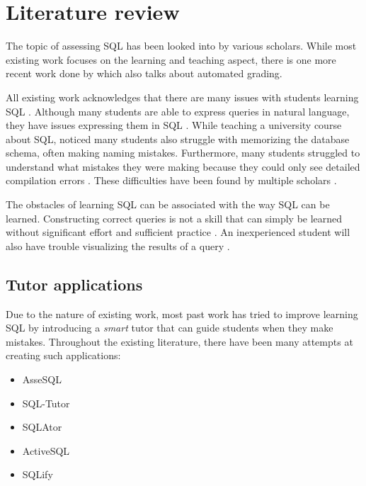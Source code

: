 \section{Literature review}

The topic of assessing SQL has been looked into by various scholars. While most existing work focuses on the learning and teaching aspect, there is one more recent work done by \cite{literature:xdata} which also talks about automated grading.

All existing work acknowledges that there are many issues with students learning SQL \citep{literature:assesql, literature:sqlify}. Although many students are able to express queries in natural language, they have issues expressing them in SQL \citep{literature:mitrovic}. While teaching a university course about SQL, \cite{literature:mitrovic} noticed many students also struggle with memorizing the database schema, often making naming mistakes. Furthermore, many students struggled to understand what mistakes they were making because they could only see detailed compilation errors \citep{literature:mitrovic}. These difficulties have been found by multiple scholars \citep{literature:assesql, literature:sqlify, literature:kearns, literature:mitrovic}.

The obstacles of learning SQL can be associated with the way SQL can be learned. Constructing correct queries is not a skill that can simply be learned without significant effort and sufficient practice \citep{literature:assesql}. An inexperienced student will also have trouble visualizing the results of a query \citep{literature:assesql}.

\subsection{Tutor applications} \label{ch:lit:sec:tutor}

Due to the nature of existing work, most past work has tried to improve learning SQL by introducing a \textit{smart} tutor that can guide students when they make mistakes. Throughout the existing literature, there have been many attempts at creating such applications:

\begin{itemize}
    \item AsseSQL \citep{literature:assesql}
    \item SQL-Tutor \citep{literature:kearns}
    \item SQLAtor \citep{literature:sqlator}
    \item ActiveSQL \citep{literature:activesql}
    \item SQLify \citep{literature:sqlify}
\end{itemize}

